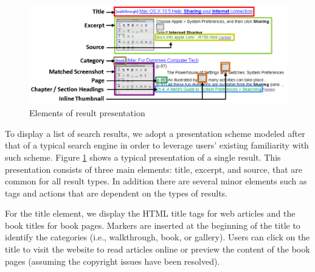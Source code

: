 \documentclass{www2010-submission}
\begin{document}



\begin{figure}
\includegraphics[width=2\columnwidth]{figure/result_tile.png}
\caption{Elements of result presentation}
\label{fig:result_tile}
\end{figure}

To display a list of search results, we adopt a presentation scheme 
modeled after that of a typical search engine in order to 
leverage users' existing familiarity with such scheme.  Figure
\ref{fig:result_tile} shows a typical presentation of a single
result. This presentation consists of three main elements: title,
excerpt, and source, that are common for all result types. In addition
there are several minor elements such as tags and actions that
are dependent on the types of results.

For the title element, we display the HTML title tags for web articles
and the book titles for book pages. Markers are inserted
at the beginning of the title to identify the categories (i.e.,
walkthrough, book, or gallery). Users can click on the title to
visit the website to read articles online or preview the content of
the book pages (assuming the copyright issues have been resolved).
\end{document}
